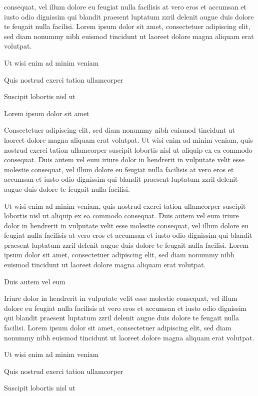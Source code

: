 \documentclass[11pt,twoside]{article}\makeatletter
\makeatletter
\def\chaptername{Chapter}
\def\mainmatter{%
  \cleardoublepage
  \def\thechapter{\@arabic\c@chapter}
  \setcounter{chapter}{0}
  \setcounter{section}{0}
  \pagenumbering{arabic}
  \setcounter{secnumdepth}{6}
  \def\@chapapp{\chaptername}%
  \def\theHchapter{\arabic{chapter}}
}
\makeatother
\begin{document}
      consequat, vel illum dolore eu feugiat nulla facilisis at vero eros et
      accumsan et iusto odio dignissim qui blandit praesent luptatum zzril
      delenit augue duis dolore te feugait nulla facilisi. Lorem ipsum dolor
      sit amet, consectetuer adipiscing elit, sed diam nonummy nibh euismod
      tincidunt ut laoreet dolore magna aliquam erat volutpat. \par Ut wisi enim ad minim veniam\par Quis nostrud exerci tation ullamcorper \par Suscipit lobortis nisl ut \par Lorem ipsum dolor sit amet\par Consectetuer adipiscing elit, sed diam nonummy nibh euismod
      tincidunt ut laoreet dolore magna aliquam erat volutpat. Ut wisi enim
      ad minim veniam, quis nostrud exerci tation ullamcorper suscipit
      lobortis nisl ut aliquip ex ea commodo consequat. Duis autem vel eum
      iriure dolor in hendrerit in vulputate velit esse molestie consequat,
      vel illum dolore eu feugiat nulla facilisis at vero eros et accumsan
      et iusto odio dignissim qui blandit praesent luptatum zzril delenit
      augue duis dolore te feugait nulla facilisi.\par Ut wisi enim ad minim veniam, quis nostrud exerci tation
      ullamcorper suscipit lobortis nisl ut aliquip ex ea commodo
      consequat. Duis autem vel eum iriure dolor in hendrerit in vulputate
      velit esse molestie consequat, vel illum dolore eu feugiat nulla
      facilisis at vero eros et accumsan et iusto odio dignissim qui blandit
      praesent luptatum zzril delenit augue duis dolore te feugait nulla
      facilisi. Lorem ipsum dolor sit amet, consectetuer adipiscing elit,
      sed diam nonummy nibh euismod tincidunt ut laoreet dolore magna
      aliquam erat volutpat. \par Duis autem vel eum \par Iriure dolor in hendrerit in vulputate velit esse molestie
      consequat, vel illum dolore eu feugiat nulla facilisis at vero eros et
      accumsan et iusto odio dignissim qui blandit praesent luptatum zzril
      delenit augue duis dolore te feugait nulla facilisi. Lorem ipsum dolor
      sit amet, consectetuer adipiscing elit, sed diam nonummy nibh euismod
      tincidunt ut laoreet dolore magna aliquam erat volutpat. \par Ut wisi enim ad minim veniam\par Quis nostrud exerci tation ullamcorper \par Suscipit lobortis nisl ut \mainmatter 
\end{document}
